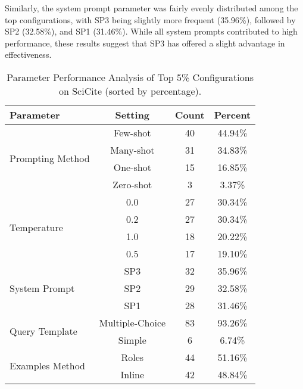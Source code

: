 Similarly, the system prompt parameter was fairly evenly distributed among the top configurations, with SP3 being slightly more frequent (35.96\%), followed by SP2 (32.58\%), and SP1 (31.46\%). 
While all system prompts contributed to high performance, 
these results suggest that SP3 has offered a slight advantage in effectiveness.

\begin{table}[t]
    \centering
    \footnotesize
    \begin{tabular}{@{}lccc@{}}
      \hline
      \textbf{Parameter}                    &  \textbf{Setting}     & \textbf{Count} & \textbf{Percent}     \\
      \hline
      \multirow{4}{*}{Prompting Method}     & Few-shot              & 40             & 44.94\%              \\
                                            & Many-shot             & 31             & 34.83\%              \\
                                            & One-shot              & 15             & 16.85\%              \\
                                            & Zero-shot             & 3              & 3.37\%               \\ \midrule
      \multirow{4}{*}{Temperature}          & 0.0                   & 27             & 30.34\%              \\
                                            & 0.2                   & 27             & 30.34\%              \\
                                            & 1.0                   & 18             & 20.22\%              \\
                                            & 0.5                   & 17             & 19.10\%              \\ \midrule
      \multirow{3}{*}{System Prompt}        & SP3                     & 32             & 35.96\%              \\
                                            & SP2                     & 29             & 32.58\%              \\
                                            & SP1                     & 28             & 31.46\%              \\ \midrule
      \multirow{2}{*}{Query Template}       & Multiple-Choice       & 83             & 93.26\%              \\
                                            & Simple                & 6              & 6.74\%               \\ \midrule
      \multirow{2}{*}{Examples Method}      & Roles                 & 44             & 51.16\%              \\
                                            & Inline                & 42             & 48.84\%              \\ 
      \hline
    \end{tabular}
    \caption{Parameter Performance Analysis of Top 5\% Configurations on SciCite (sorted by percentage).}\label{tab:parameter_performance}
\end{table}


